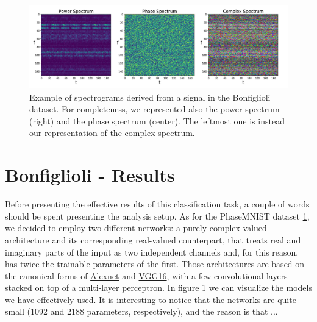 \documentclass[../main.tex]{subfiles}
\begin{document}
\begin{figure}[ht]
	\centering
	\includegraphics[width=\textwidth]{pictures/example_bonfiglioli_spectrum}
	\caption{Example of spectrograms derived from a signal in the Bonfiglioli dataset. For completeness, we represented also the power spectrum (right) and the phase spectrum (center). The leftmost one is instead our representation of the complex spectrum.}
	\label{fig:example_bonfiglioli_spectrum}
\end{figure}


\section{Bonfiglioli - Results}

Before presenting the effective results of this classification task, a couple of words should be spent presenting the analysis setup. As for the PhaseMNIST dataset \ref{}, we decided to employ two different networks: a purely complex-valued architecture and its corresponding real-valued counterpart, that treats real and imaginary parts of the input as two independent channels and, for this reason, has twice the trainable parameters of the first. Those architectures are based on the canonical forms of \href{https://en.wikipedia.org/wiki/AlexNet}{Alexnet} and \href{https://medium.com/@mygreatlearning/what-is-vgg16-introduction-to-vgg16-f2d63849f615}{VGG16}, with a few convolutional layers stacked on top of a multi-layer perceptron. In figure \ref{} we can visualize the models we have effectively used. It is interesting to notice that the networks are quite small (1092 and 2188 parameters, respectively), and the reason is that ...

\end{document}
